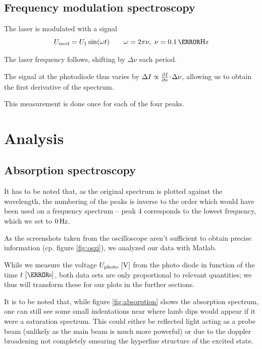 \subsection{Frequency modulation spectroscopy}
The laser is modulated with a signal
\begin{equation}
 U_\text{mod} = U_1 \sin(\omega t) \qquad \omega = 2 \pi \nu,~ \nu = 0.1\,\mega\hertz
\end{equation}

The laser frequency follows, shifting by $\Delta \nu$ each period.

The signal at the photodiode thus varies by $\Delta I \propto \frac{\partial I}{\partial\nu} \!\cdot\! \Delta \nu$, allowing us to obtain the first derivative of the spectrum.

This measurement is done once for each of the four peaks.



\newpage
\section{Analysis}
\subsection{Absorption spectroscopy}

It has to be noted that, as the original spectrum is plotted against the wavelength, the numbering of the peaks is inverse to the order which would have been used on a frequency spectrum -- peak 4 corresponds to the lowest frequency, which we set to $0 \,\hertz$.

As the screenshots taken from the oscilloscope aren't sufficient to obtain precise information (cp. figure \ref{fig:oszi}), we analyzed our data with Matlab.

While we measure the voltage $U_\text{photo}~[\volt]$ from the photo diode in function of the time $t~[\milli\second]$, both data sets are only proportional to relevant quantities; we thus will transform these for our plots in the further sections.

It is to be noted that, while figure \ref{fig:absorption} shows the absorption spectrum, one can still see some small indentations near where lamb dips would appear if it were a saturation spectrum. This could either be reflected light acting as a probe beam (unlikely as the main beam is much more powerful) or due to the doppler broadening not completely smearing the hyperfine structure of the excited state.

